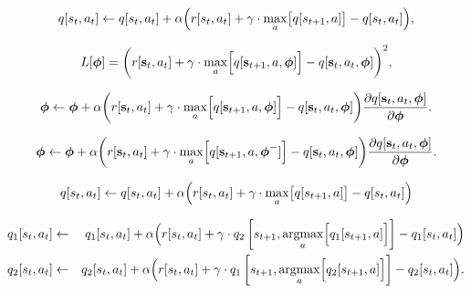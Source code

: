 \documentclass[letterpaper,twoside,openany, titlepage,oldfontcommands,titles,dvipsnames]{memoir}
\begin{document}
\begin{eqnarray}\label{eq:reinforce_qlearning}
 q[s_t,a_t] \leftarrow q[s_t,a_t] + \alpha \Bigl(r[s_t,a_t]+\gamma \cdot \max_{a}\bigl[q[s_{t+1},a]\bigr] - q[s_t,a_t]\Bigr),
 \end{eqnarray}

\begin{eqnarray}
 L[\boldsymbol\phi] = \biggl(r[\mathbf{s}_t,a_t]+\gamma \cdot \max_{a}\Bigl[q[\mathbf{s}_{t+1},a,\boldsymbol\phi]\Bigr] - q[\mathbf{s}_t,a_t,\boldsymbol\phi]\biggr)^2,
 \end{eqnarray}

\begin{eqnarray}
 \boldsymbol\phi \leftarrow \boldsymbol\phi + \alpha \biggl(r[\mathbf{s}_t,a_t]+\gamma \cdot \max_{a}\Bigl[q[\mathbf{s}_{t+1},a,\boldsymbol\phi]\Bigr] - q[\mathbf{s}_t,a_t,\boldsymbol\phi]\biggr)\frac{\partial q[\mathbf{s}_{t},a_{t},\boldsymbol\phi]}{\partial \boldsymbol\phi}.
 \end{eqnarray}

\begin{eqnarray}
 \boldsymbol\phi \leftarrow \boldsymbol\phi + \alpha \biggl(r[\mathbf{s}_t,a_t]+\gamma \cdot \max_{a}\Bigl[q[\mathbf{s}_{t+1},a,\boldsymbol\phi^{-}]\Bigr] - q[\mathbf{s}_t,a_t,\boldsymbol\phi]\biggr)\frac{\partial q[\mathbf{s}_{t},a_{t},\boldsymbol\phi]}{\partial \boldsymbol\phi}.
 \end{eqnarray}

\begin{eqnarray}\label{eq:reinforce_qlearning2}
 q[s_t,a_t] \leftarrow q[s_t,a_t] + \alpha \Bigl(r[s_t,a_t]+\gamma \cdot \max_{a}\bigl[q[s_{t+1},a]\bigr] - q[s_t,a_t]\Bigr)
 \end{eqnarray}

\begin{eqnarray}\label{eq:reinforce_qlearning3}
 q_1[s_t,a_t] &\leftarrow& q_1[s_t,a_t] + \alpha \Bigl(r[s_t,a_t]+\gamma \cdot q_2\left[s_{t+1},\mathop{\rm argmax}_{a}\Bigl[q_1[s_{t+1},a]\Bigr]\right] - q_1[s_t,a_t]\Bigr)\nonumber\\
 q_2[s_t,a_t] &\leftarrow& q_2[s_t,a_t] + \alpha \Bigl(r[s_t,a_t]+\gamma \cdot q_1\left[s_{t+1},\mathop{\rm argmax}_{a}\Bigl[q_2[s_{t+1},a]\Bigr]\right] - q_2[s_t,a_t]\Bigr).\nonumber \\
 \end{eqnarray}
\end{document}
